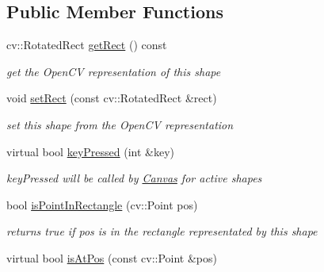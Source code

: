 \subsection*{Public Member Functions}
\begin{DoxyCompactItemize}
\item 
cv\+::\+Rotated\+Rect \hyperlink{classcanvascv_1_1Rectangle_aa821fa0533fed58ce488d796a25f7d74}{get\+Rect} () const \hypertarget{classcanvascv_1_1Rectangle_aa821fa0533fed58ce488d796a25f7d74}{}\label{classcanvascv_1_1Rectangle_aa821fa0533fed58ce488d796a25f7d74}

\begin{DoxyCompactList}\small\item\em get the Open\+CV representation of this shape \end{DoxyCompactList}\item 
void \hyperlink{classcanvascv_1_1Rectangle_a5149d50c87c3388619ace3badd868f50}{set\+Rect} (const cv\+::\+Rotated\+Rect \&rect)\hypertarget{classcanvascv_1_1Rectangle_a5149d50c87c3388619ace3badd868f50}{}\label{classcanvascv_1_1Rectangle_a5149d50c87c3388619ace3badd868f50}

\begin{DoxyCompactList}\small\item\em set this shape from the Open\+CV representation \end{DoxyCompactList}\item 
virtual bool \hyperlink{classcanvascv_1_1Rectangle_a905ec50de408cbc2df0158bafff210d1}{key\+Pressed} (int \&key)
\begin{DoxyCompactList}\small\item\em key\+Pressed will be called by \hyperlink{classcanvascv_1_1Canvas}{Canvas} for active shapes \end{DoxyCompactList}\item 
bool \hyperlink{classcanvascv_1_1Rectangle_a2562d2ae0fac60c5604b2b5c5a5a24d0}{is\+Point\+In\+Rectangle} (cv\+::\+Point pos)\hypertarget{classcanvascv_1_1Rectangle_a2562d2ae0fac60c5604b2b5c5a5a24d0}{}\label{classcanvascv_1_1Rectangle_a2562d2ae0fac60c5604b2b5c5a5a24d0}

\begin{DoxyCompactList}\small\item\em returns true if pos is in the rectangle representated by this shape \end{DoxyCompactList}\item 
virtual bool \hyperlink{classcanvascv_1_1Rectangle_a90af43d63545f799eda44a7d107358de}{is\+At\+Pos} (const cv\+::\+Point \&pos)\hypertarget{classcanvascv_1_1Rectangle_a90af43d63545f799eda44a7d107358de}{}\label{classcanvascv_1_1Rectangle_a90af43d63545f799eda44a7d107358de}


\end{DoxyCompactItemize}
